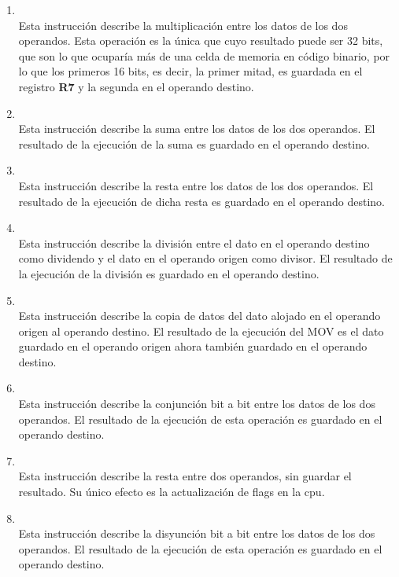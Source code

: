 \begin{enumerate}
\item  {}\\
Esta instrucción describe la multiplicación entre los datos de los dos operandos. Esta operación es la única que cuyo resultado puede ser 32 bits, que son lo que ocuparía más de una celda de memoria en código binario, por lo que los primeros 16 bits, es decir, la primer mitad, es guardada en el registro \textbf{R7} y la segunda en el operando destino.
 
\item  {}\\
Esta instrucción describe la suma entre los datos de los dos operandos. El resultado de la ejecución de la suma es guardado en el operando destino.

\item  {}\\
Esta instrucción describe la resta entre los datos de los dos operandos. El resultado de la ejecución de dicha resta es guardado en el operando destino.

\item  {}\\
Esta instrucción describe la división entre el dato en el operando destino como dividendo y el dato en el operando origen como divisor. El resultado de la ejecución de la división es guardado en el operando destino.

\item  {}\\
Esta instrucción describe la copia de datos del dato alojado en el operando origen al operando destino. El resultado de la ejecución del MOV es el dato guardado en el operando origen ahora también guardado en el operando destino.

\item  {}\\
Esta instrucción describe la conjunción bit a bit entre los datos de los dos operandos. El resultado de la ejecución de esta operación es guardado en el operando destino.

\item  {}\\
Esta instrucción describe la resta entre dos operandos, sin guardar el resultado. Su único efecto es la actualización de flags en la cpu.

\item  {}\\
Esta instrucción describe la disyunción bit a bit entre los datos de los dos operandos. El resultado de la ejecución de esta operación es guardado en el operando destino.
\end{enumerate}

